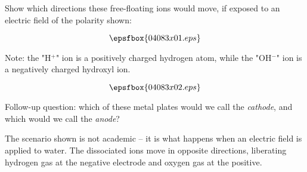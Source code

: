 

Show which directions these free-floating ions would move, if exposed to an electric field of the polarity shown:

$$\epsfbox{04083x01.eps}$$

Note: the "H$^{+}$" ion is a positively charged hydrogen atom, while the "OH$^{-}$" ion is a negatively charged hydroxyl ion.







$$\epsfbox{04083x02.eps}$$

\vskip 10pt

Follow-up question: which of these metal plates would we call the {\it cathode}, and which would we call the {\it anode}?







The scenario shown is not academic -- it is what happens when an electric field is applied to water.  The dissociated ions move in opposite directions, liberating hydrogen gas at the negative electrode and oxygen gas at the positive.




